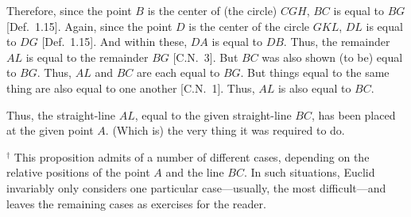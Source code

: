 \begin{Parallel}{}{}
{\epsfysize=3.5in
\centerline{}

Therefore, since the point $B$ is the center of (the circle) $CGH$, $BC$ is equal to 
$BG$ [Def.~1.15]. Again, since the point $D$ is the center of the circle $GKL$, $DL$ is equal to $DG$ [Def.~1.15]. And within these,  $DA$ is equal to $DB$. Thus, the remainder $AL$ is equal to the remainder $BG$ [C.N.~3]. But $BC$ was also shown (to be)  equal to $BG$. Thus,  $AL$
and $BC$ are each equal to $BG$. But things equal to the same thing are also equal to one another [C.N.~1]. Thus, $AL$ is also equal to $BC$.

Thus, the straight-line $AL$, equal to the given straight-line $BC$,
has been placed at the given point $A$. (Which is) the very thing it was required to do.}
\end{Parallel}
{\footnotesize
\noindent $^\dag$ This proposition admits of a number
of different cases, depending on the relative positions of the point $A$
and the line $BC$. In such situations, Euclid invariably only considers one
particular case---usually, the most difficult---and leaves the remaining cases as
exercises for the reader.}

